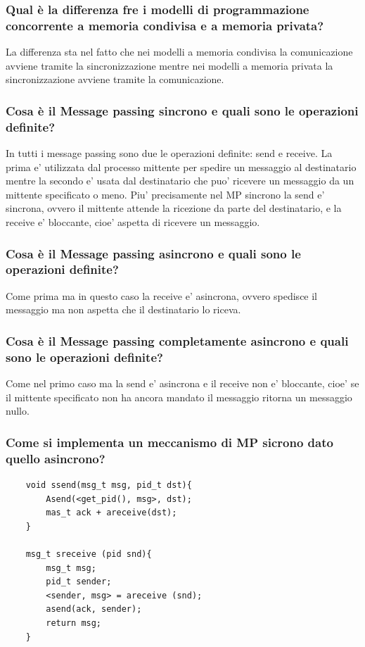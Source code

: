 \documentclass{article}
\begin{document}
\subsubsection{Qual è la differenza fre i modelli di programmazione concorrente a memoria condivisa e a memoria privata?}
La differenza sta nel fatto che nei modelli a memoria condivisa la
comunicazione avviene tramite la sincronizzazione mentre nei modelli a memoria
privata la sincronizzazione avviene tramite la comunicazione.
\subsubsection{Cosa è il Message passing sincrono e quali sono le operazioni definite?}
In tutti i message passing sono due le operazioni definite: send e receive. La
prima e' utilizzata dal processo mittente per spedire un messaggio al
destinatario mentre la secondo e' usata dal destinatario che puo' ricevere un
messaggio da un mittente specificato o meno. Piu' precisamente nel MP sincrono
la send e' sincrona, ovvero il mittente attende la ricezione da parte del
destinatario, e la receive e' bloccante, cioe' aspetta di ricevere un
messaggio.
\subsubsection{Cosa è il Message passing asincrono e quali sono le operazioni definite?}
Come prima ma in questo caso la receive e' asincrona, ovvero spedisce il
messaggio ma non aspetta che il destinatario lo riceva.
\subsubsection{Cosa è il Message passing completamente asincrono e quali sono le operazioni definite?}
Come nel primo caso ma la send e' asincrona e il receive non e' bloccante,
cioe' se il mittente specificato non ha ancora mandato il messaggio ritorna un
messaggio nullo.
\subsubsection{Come si implementa un meccanismo di MP sicrono dato quello asincrono?}
\begin{verbatim}
    void ssend(msg_t msg, pid_t dst){
        Asend(<get_pid(), msg>, dst);
        mas_t ack + areceive(dst);
    }

    msg_t sreceive (pid snd){
        msg_t msg;
        pid_t sender;
        <sender, msg> = areceive (snd);
        asend(ack, sender);
        return msg;
    }
\end{verbatim}
\end{document}

